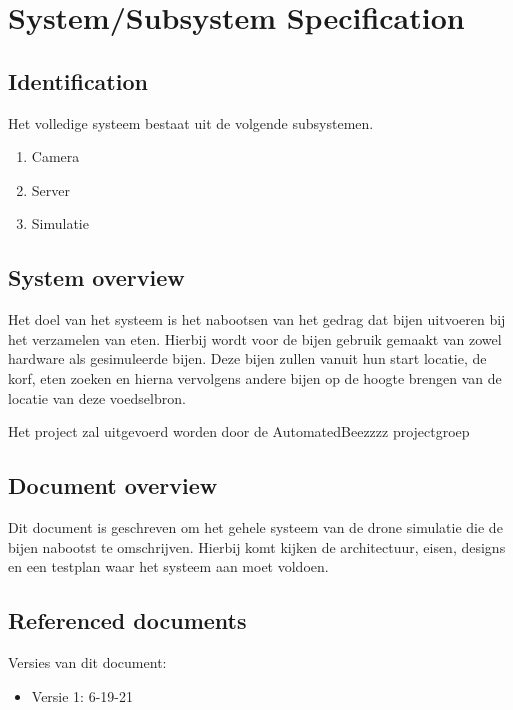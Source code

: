 \section{System/Subsystem Specification}


\subsection{Identification}
Het volledige systeem bestaat uit de volgende subsystemen.
\begin{enumerate}
    \item Camera
    \item Server
    \item Simulatie
\end{enumerate}

\subsection{System overview}
Het doel van het systeem is het nabootsen van het gedrag dat bijen uitvoeren bij het verzamelen van eten.
Hierbij wordt voor de bijen gebruik gemaakt van zowel hardware als gesimuleerde bijen.
Deze bijen zullen vanuit hun start locatie, de korf, eten zoeken
en hierna vervolgens andere bijen op de hoogte brengen van de locatie van deze voedselbron.

Het project zal uitgevoerd worden door de AutomatedBeezzzz projectgroep

\subsection{Document overview}
Dit document is geschreven om het gehele systeem van de drone simulatie die de bijen nabootst te omschrijven. Hierbij komt kijken de architectuur, eisen, designs en een testplan waar het systeem aan moet voldoen.

\subsection{Referenced documents}
Versies van dit document:
\begin{itemize}
    \item Versie 1: 6-19-21
\end{itemize}
